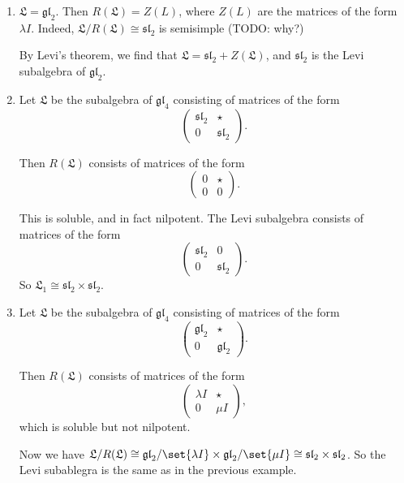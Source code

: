 \begin{enumerate}
	\item $\mathfrak{L} = \mathfrak{gl}_2$.
		Then $R(\mathfrak{L}) = Z(L)$, where $Z(L)$ are the matrices of the form
		$\lambda I$. Indeed, $\mathfrak{L}/R(\mathfrak{L})\cong \mathfrak{sl}_2$
		is semisimple (TODO: why?)

		By Levi's theorem, we find that $\mathfrak{L} = \mathfrak{sl}_2 + Z(\mathfrak{L})$,
		and $\mathfrak{sl}_2$ is the Levi subalgebra of $\mathfrak{gl}_2$.

	\item
		Let $\mathfrak{L}$ be the subalgebra of $\mathfrak{gl}_4$ consisting of
		matrices of the form
		\[
			\begin{pmatrix}
				\mathfrak{sl}_2 & \star\\0&\mathfrak{sl}_2
			\end{pmatrix}.
			\]

		Then $R(\mathfrak{L})$ consists of matrices of the form
		\[
			\begin{pmatrix}
				0 & \star\\0 & 0
			\end{pmatrix}.
			\]

		This is soluble, and in fact nilpotent. The Levi subalgebra consists
		of matrices of the form
		\[
			\begin{pmatrix}
				\mathfrak{sl}_2&0\\0&\mathfrak{sl}_2
			\end{pmatrix}.
			\]
		So $\mathfrak{L}_1\cong \mathfrak{sl}_2\times \mathfrak{sl}_2$.

	\item
		Let $\mathfrak{L}$ be the subalgebra of $\mathfrak{gl}_4$ consisting of
		matrices of the form
		\[
			\begin{pmatrix}
				\mathfrak{gl}_2 & \star\\0&\mathfrak{gl}_2
			\end{pmatrix}.
			\]

		Then $R(\mathfrak{L})$ consists of matrices of the form
		\[
			\begin{pmatrix}
				\lambda I & \star\\0 & \mu I
			\end{pmatrix}, \]
		which is soluble but not nilpotent.

		Now we have $\mathfrak{L}/R(\mathfrak{L}) \cong \mathfrak{gl}_2/\set{\lambda I}\times \mathfrak{gl}_2/\set{\mu I} \cong \mathfrak{sl}_2\times \mathfrak{sl}_2$.
		So the Levi subablegra is the same as in the previous example.
\end{enumerate}
